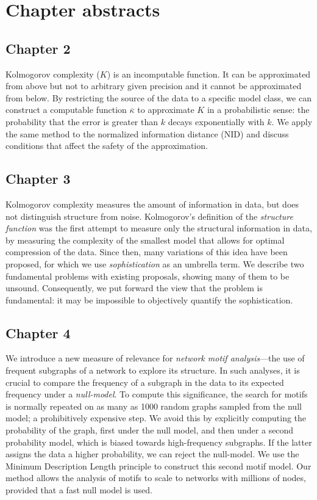 \documentclass{scrartcl}
\begin{document}
\section{Chapter abstracts}

\subsection{Chapter 2}
Kolmogorov complexity ($K$) is an incomputable function. It can be approximated from above but not to arbitrary given precision and it cannot be approximated from below. By restricting the source of the data to a specific model class, we can construct a computable function $\overline{\kappa}$ to approximate $K$ in a probabilistic sense: the probability that the error is greater than $k$ decays exponentially with $k$. We apply the same method to the normalized information distance (NID) and discuss conditions that affect the safety of the approximation.

\subsection{Chapter 3}
Kolmogorov complexity measures the amount of information in data, but does not distinguish structure from noise. Kolmogorov's definition of the \emph{structure function} was the first attempt to measure only the structural information in data, by measuring the complexity of the smallest model that allows for optimal compression of the data. Since then, many variations of this idea have been proposed, for which we use \emph{sophistication} as an umbrella term. We describe two fundamental problems with existing proposals, showing many of them to be unsound. Consequently, we put forward the view that the problem is fundamental: it may be impossible to objectively quantify the sophistication.

\subsection{Chapter 4}

We introduce a new measure of relevance for \emph{network motif analysis}---the use of frequent subgraphs of a network to explore its structure. In such analyses, it is crucial to compare the frequency of a subgraph in the data to its expected frequency under a \emph{null-model}. To compute this significance, the search for motifs is normally repeated on as many as 1000 random graphs sampled from the null model; a prohibitively expensive step. We avoid this by explicitly computing the probability of the graph, first under the null model, and then under a second probability model, which is biased towards high-frequency subgraphs. If the latter assigns the data a higher probability, we can reject the null-model. We use the Minimum Description Length principle to construct this second  motif model. Our method allows the analysis of motifs to scale to networks with millions of nodes, provided that a fast null model is used. 
\end{document}
